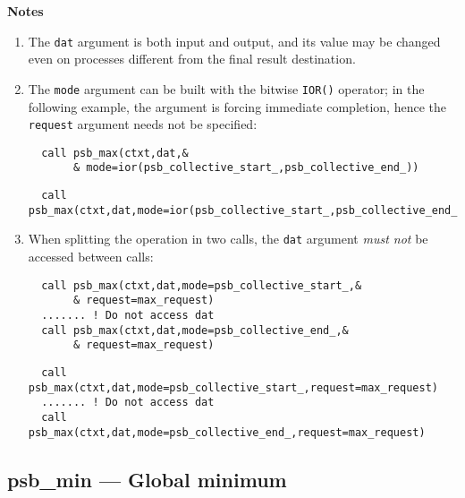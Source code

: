 {\par\noindent\large\bfseries Notes}
\begin{enumerate}
\item The \verb|dat| argument is both input and output, and its
  value may be changed even on processes different from the final
  result destination.
\item The \verb|mode| argument can be built with the bitwise
  \verb|IOR()| operator; in the following example, the   argument is
  forcing immediate completion, hence the \verb|request| argument
  needs not be specified: 
\ifpdf
\begin{verbatim}
  call psb_max(ctxt,dat,&
       & mode=ior(psb_collective_start_,psb_collective_end_))
\end{verbatim}
\else
\begin{center}
    \begin{minipage}[tl]{0.9\textwidth}
\begin{verbatim} 
  call psb_max(ctxt,dat,mode=ior(psb_collective_start_,psb_collective_end_))
\end{verbatim}
    \end{minipage}
  \end{center}
\fi
  
\item When splitting the operation in two calls, the \verb|dat|
  argument  \emph{must not} be accessed between calls:
\ifpdf
\begin{verbatim}
  call psb_max(ctxt,dat,mode=psb_collective_start_,&
       & request=max_request)
  ....... ! Do not access dat 
  call psb_max(ctxt,dat,mode=psb_collective_end_,&
       & request=max_request)
\end{verbatim}
\else
\begin{center}
    \begin{minipage}[tl]{0.9\textwidth}
\begin{verbatim} 
  call psb_max(ctxt,dat,mode=psb_collective_start_,request=max_request)
  ....... ! Do not access dat 
  call psb_max(ctxt,dat,mode=psb_collective_end_,request=max_request)
\end{verbatim}
    \end{minipage}
  \end{center}
\fi
\end{enumerate}

\clearpage\subsection{psb\_min --- Global minimum}

